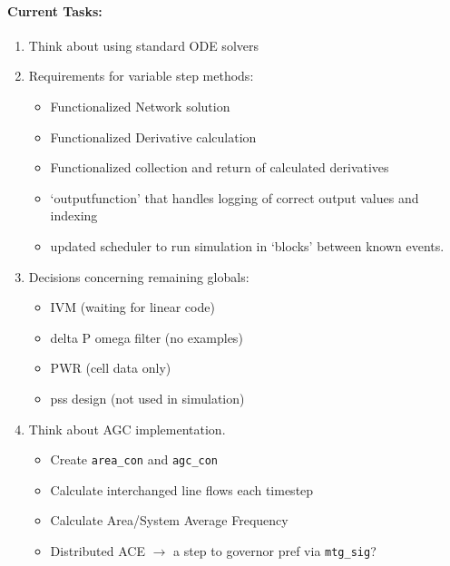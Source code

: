 \documentclass[12pt]{article}
\begin{document}
\begin{multicols}{2}
\paragraph{Current Tasks:}
	\begin{enumerate}
		\itemsep 0em 
		\item Think about using standard ODE solvers
				\item Requirements for variable step methods:
						\begin{minipage}{\linewidth}
							\begin{itemize}
								\itemsep0em 
								\footnotesize
								\item Functionalized Network solution
								\item Functionalized Derivative calculation
								\item Functionalized collection and return of calculated derivatives
								\item `outputfunction' that handles logging of correct output values and indexing
								\item updated scheduler to run simulation in `blocks' between known events.
							\end{itemize}
						\end{minipage}
		\item Decisions concerning remaining globals:
		\begin{minipage}{\linewidth}
						\begin{itemize}
				\itemsep0em 
						\footnotesize
							\item IVM (waiting for linear code)
							\item delta P omega filter (no examples)
							\item PWR (cell data only)
							\item pss design (not used in simulation)
						\end{itemize}
				\end{minipage}
		\item Think about AGC implementation.
		\begin{minipage}{\linewidth}
						\begin{itemize}
				\itemsep0em 
						\footnotesize
				\item Create \verb|area_con| and \verb|agc_con|
				\item Calculate interchanged line flows each timestep
				\item Calculate Area/System Average Frequency
				\item Distributed ACE $\longrightarrow$ a step to governor pref via \verb|mtg_sig|?
							

\end{itemize}
\end{minipage}
\end{enumerate}
\end{multicols}
\end{document}
